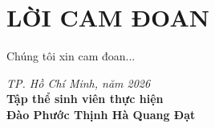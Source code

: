 \chapter*{LỜI CAM ĐOAN}

Chúng tôi xin cam đoan...

\vspace{1cm}
\begin{flushright}
    \textit{TP. Hồ Chí Minh, năm 2026} \\[0.2cm]
    \textbf{Tập thể sinh viên thực hiện} \\[1.5cm]
    \textbf{Đào Phước Thịnh \qquad Hà Quang Đạt}
\end{flushright}
\newpage

